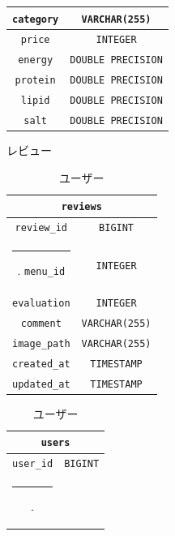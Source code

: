 \documentclass[a4paper]{ltjsarticle}
\makeatletter
\def\Hline{
    \noalign{\ifnum0=`}\fi\hrule \@height 3.\arrayrulewidth \futurelet
    \reserved@a\@xhline}
\makeatother
\begin{document}
\begin{table}[h]
\begin{minipage}[t]{.49\textwidth}
\begin{tabular}{|c|c|}
                    \verb|category| & \verb|VARCHAR(255)| \\ \hline
                    \verb|price| & \verb|INTEGER| \\ \hline
                    \verb|energy| & \verb|DOUBLE PRECISION| \\ \hline
                    \verb|protein| & \verb|DOUBLE PRECISION| \\ \hline
                    \verb|lipid| & \verb|DOUBLE PRECISION| \\ \hline
                    \verb|salt| & \verb|DOUBLE PRECISION| \\ \hline
                \end{tabular}
            \end{minipage}
        \end{table}
        \begin{table}[ht]
            \begin{minipage}[t]{.49\textwidth}
                \center
                \caption{レビュー}
                \label{reviews}
                \begin{tabular}{|c|c|}
                    \hline
                    \multicolumn{2}{|c|}{\texttt{reviews}} \\ \hline \hline
                    \verb|review_id| & \verb|BIGINT| \\ \Hline
                    \verb|menu_id| & \verb|INTEGER| \\ \hline
                    \verb|evaluation| & \verb|INTEGER| \\ \hline
                    \verb|comment| & \verb|VARCHAR(255)| \\ \hline
                    \verb|image_path| & \verb|VARCHAR(255)| \\ \hline
                    \verb|created_at| & \verb|TIMESTAMP| \\ \hline
                    \verb|updated_at| & \verb|TIMESTAMP| \\ \hline
                \end{tabular}
            \end{minipage}
            \begin{minipage}[t]{.49\textwidth}
                \center
                \caption{ユーザー}
                \label{users}
                \begin{tabular}{|c|c|}
                    \hline
                    \multicolumn{2}{|c|}{\texttt{users}} \\ \hline \hline
                    \verb|user_id| & \verb|BIGINT| \\ \Hline

\end{tabular}
\end{minipage}
\end{table}
\end{document}

